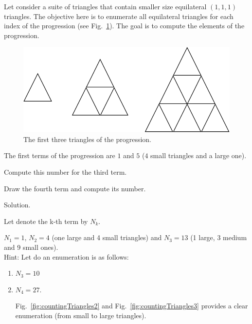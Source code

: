 \documentclass{article}[12pt]
\begin{document}
Let consider a suite of triangles that contain smaller size equilateral $(1,1,1)$ triangles. 
The objective here is to enumerate all equilateral triangles for each index of the progression
(see Fig.~\ref{fig:countingTriangles}).
The goal is to compute the elements of the progression.
\begin{figure}[h]
\begin{center}
        \includegraphics[scale=0.4]{FiguresArithmetic/CountingTriangles} 
        \caption{The first three triangles of the progression.}
        \label{fig:countingTriangles}
\end{center}
\end{figure}

The first terms of the progression are $1$ and $5$ ($4$ small triangles and a large one).

Compute this number for the third term.

Draw the fourth term and compute its number.

Solution.

Let denote the k-th term by $N_k$.

$N_1=1$, $N_2=4$ (one large and 4 small triangles) and $N_3=13$ (1 large, 3 medium and 9 small ones).
\\

Hint: Let do an enumeration is as follows:
\begin{enumerate}
\item
$N_3 = 10$
\item 
$N_4 = 27$.

Fig.~\ref{fig:countingTriangles2} and Fig.~\ref{fig:countingTriangles3}
provides a clear enumeration (from small to large triangles).
\end{enumerate}
\end{document}
